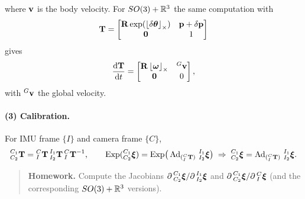 where $\boldsymbol{\mathbf{v}}$ is the body velocity. For $SO(3)+\mathbb{R}^3$ the same computation with
\begin{align}
\boldsymbol{\mathbf{T}} = \begin{bmatrix}\boldsymbol{\mathbf{R}}\exp(\left\lfloor\delta\boldsymbol{\mathbf{\theta}}\right\rfloor_{\times}) & \boldsymbol{\mathbf{p}}+\delta\boldsymbol{\mathbf{p}}\\\boldsymbol{\mathbf{0}}&1\end{bmatrix}
\end{align}
gives
\begin{align}
\frac{\mathrm{d}\boldsymbol{\mathbf{T}}}{\mathrm{d}t} = \begin{bmatrix}\boldsymbol{\mathbf{R}}\left\lfloor\boldsymbol{\mathbf{\omega}}\right\rfloor_{\times} & {}^{G}\boldsymbol{\mathbf{v}}\\\boldsymbol{\mathbf{0}}&0\end{bmatrix},
\end{align}
with ${}^{G}\boldsymbol{\mathbf{v}}$ the global velocity.

\paragraph{(3) Calibration.} For IMU frame $\{I\}$ and camera frame $\{C\}$,
\begin{align}
{}^{C_1}_{C_2}\boldsymbol{\mathbf{T}} = {}^{C}_{I}\boldsymbol{\mathbf{T}}\,{}^{I_1}_{I_2}\boldsymbol{\mathbf{T}}\,{}^{C}_{I}\boldsymbol{\mathbf{T}}^{-1}, \qquad
\operatorname{Exp}({}^{C_1}_{C_2}\boldsymbol{\mathbf{\xi}}) = \operatorname{Exp}\!\big(\operatorname{Ad}_{({}^{C}_{I}\boldsymbol{\mathbf{T}})}\,{}^{I_1}_{I_2}\boldsymbol{\mathbf{\xi}}\big)\;\Rightarrow\;{}^{C_1}_{C_2}\boldsymbol{\mathbf{\xi}} = \operatorname{Ad}_{({}^{C}_{I}\boldsymbol{\mathbf{T}})}\,{}^{I_1}_{I_2}\boldsymbol{\mathbf{\xi}}.
\end{align}
\begin{quote}
\textbf{Homework.} Compute the Jacobians $\partial\,{}^{C_1}_{C_2}\boldsymbol{\mathbf{\xi}}/\partial\,{}^{I_1}_{I_2}\boldsymbol{\mathbf{\xi}}$ and $\partial\,{}^{C_1}_{C_2}\boldsymbol{\mathbf{\xi}}/\partial\,{}^{C}_{I}\boldsymbol{\mathbf{\xi}}$ (and the corresponding $SO(3)+\mathbb{R}^3$ versions).
\end{quote}

